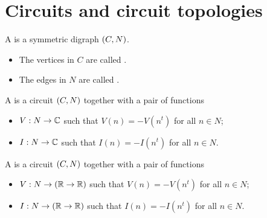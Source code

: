 \chapter{Circuits and circuit topologies}
\begin{definition}
A  is a symmetric digraph $\left( C,N \right)$.
\begin{itemize}
\item The vertices in $C$ are called .
\item The edges in $N$ are called .
\end{itemize}

A  is a circuit $\left( C, N \right)$ together with a pair of functions
\begin{itemize}
\item $V: N \to \mathbb{C}$ such that $V(n) = - V(n^t)$ for all $n\in N$;
\item $I: N \to \mathbb{C}$ such that $I(n) = - I(n^t)$ for all $n\in N$.
\end{itemize} 
A  is a circuit $\left( C, N \right)$ together with a pair of functions
\begin{itemize}
\item $V: N \to (\mathbb{R}\to \mathbb{R})$ such that $V(n) = - V(n^t)$ for all $n\in N$;
\item $I: N \to (\mathbb{R}\to \mathbb{R})$ such that $I(n) = - I(n^t)$ for all $n\in N$.
\end{itemize} 
\end{definition}

\chapter{}